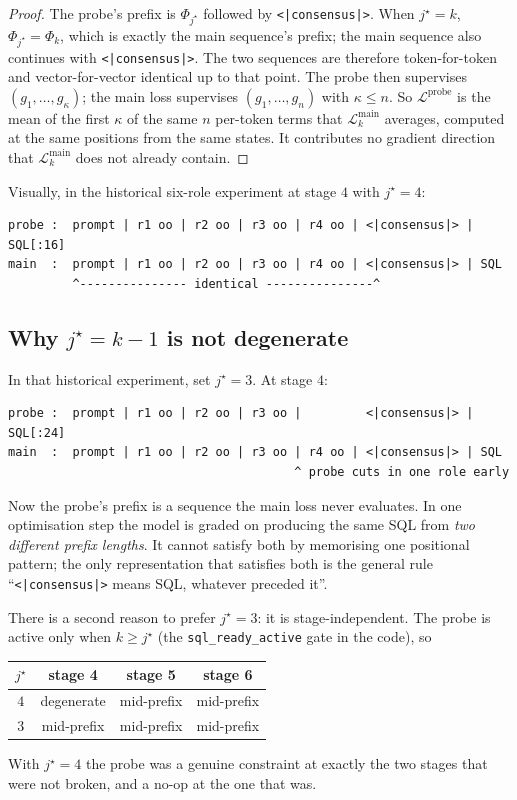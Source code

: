 \documentclass[11pt]{article}
\theoremstyle{definition}
\begin{document}
\begin{proof}
The probe's prefix is $\Phi_{j^\star}$ followed by \texttt{<|consensus|>}. When $j^\star = k$, $\Phi_{j^\star} = \Phi_k$, which is exactly the main sequence's prefix; the main sequence also continues with \texttt{<|consensus|>}. The two sequences are therefore token-for-token and vector-for-vector identical up to that point. The probe then supervises $(g_1,\dots,g_\kappa)$; the main loss supervises $(g_1,\dots,g_n)$ with $\kappa \le n$. So $\mathcal{L}^{\mathrm{probe}}$ is the mean of the first $\kappa$ of the same $n$ per-token terms that $\mathcal{L}^{\mathrm{main}}_k$ averages, computed at the same positions from the same states. It contributes no gradient direction that $\mathcal{L}^{\mathrm{main}}_k$ does not already contain.
\end{proof}

Visually, in the historical six-role experiment at stage $4$ with $j^\star=4$:
\begin{lstlisting}
probe :  prompt | r1 oo | r2 oo | r3 oo | r4 oo | <|consensus|> | SQL[:16]
main  :  prompt | r1 oo | r2 oo | r3 oo | r4 oo | <|consensus|> | SQL
         ^--------------- identical ---------------^
\end{lstlisting}

\subsection{Why $j^\star = k-1$ is not degenerate}

In that historical experiment, set $j^\star = 3$. At stage $4$:
\begin{lstlisting}
probe :  prompt | r1 oo | r2 oo | r3 oo |         <|consensus|> | SQL[:24]
main  :  prompt | r1 oo | r2 oo | r3 oo | r4 oo | <|consensus|> | SQL
                                        ^ probe cuts in one role early
\end{lstlisting}
Now the probe's prefix is a sequence the main loss never evaluates. In one optimisation step the model is graded on producing the same SQL from \emph{two different prefix lengths}. It cannot satisfy both by memorising one positional pattern; the only representation that satisfies both is the general rule ``\texttt{<|consensus|>} means SQL, whatever preceded it''.

There is a second reason to prefer $j^\star = 3$: it is stage-independent. The probe is active only when $k \ge j^\star$ (the \texttt{sql\_ready\_active} gate in the code), so
\begin{center}
\begin{tabular}{cccc}
\toprule
$j^\star$ & stage 4 & stage 5 & stage 6 \\
\midrule
$4$ & degenerate & mid-prefix & mid-prefix \\
$3$ & mid-prefix & mid-prefix & mid-prefix \\
\bottomrule
\end{tabular}
\end{center}
With $j^\star=4$ the probe was a genuine constraint at exactly the two stages that were not broken, and a no-op at the one that was.
\end{document}
